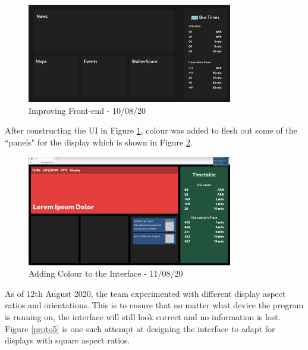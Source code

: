 \documentclass{article}
\begin{document}
		\begin{figure}[h!]
			\centering
			\includegraphics[width=0.8\textwidth]{Figures/prototype3.png}
			\caption{Improving Front-end - 10/08/20}
			\label{proto3}
		\end{figure}
		After constructing the UI in Figure \ref{proto3}, colour was added to flesh out some of the ``panels" for the display which is shown in Figure \ref{proto4}.
		\begin{figure}[H]
			\centering
			\includegraphics[width=0.8\textwidth]{Figures/prototype4.png}
			\caption{Adding Colour to the Interface - 11/08/20}
			\label{proto4}
		\end{figure}
		As of 12th August 2020, the team experimented with different display aspect ratios and orientations. This is to ensure that no matter what device the program is running on, the interface will still look correct and no information is lost. Figure \ref{proto5} is one such attempt at designing the interface to adapt for displays with square aspect ratios. \\
		
\end{document}
